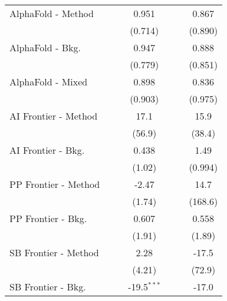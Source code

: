 \begin{tabular}{lcccccc}
   AlphaFold - Method             &              &         & 0.951         &              &              & 0.867\\   
                                  &              &         & (0.714)       &              &              & (0.890)\\   
   AlphaFold - Bkg.               &              &         & 0.947         &              &              & 0.888\\   
                                  &              &         & (0.779)       &              &              & (0.851)\\   
   AlphaFold - Mixed              &              &         & 0.898         &              &              & 0.836\\   
                                  &              &         & (0.903)       &              &              & (0.975)\\   
   AI Frontier - Method           &              &         & 17.1          &              &              & 15.9\\   
                                  &              &         & (56.9)        &              &              & (38.4)\\   
   AI Frontier - Bkg.             &              &         & 0.438         &              &              & 1.49\\   
                                  &              &         & (1.02)        &              &              & (0.994)\\   
   PP Frontier - Method           &              &         & -2.47         &              &              & 14.7\\   
                                  &              &         & (1.74)        &              &              & (168.6)\\   
   PP Frontier - Bkg.             &              &         & 0.607         &              &              & 0.558\\   
                                  &              &         & (1.91)        &              &              & (1.89)\\   
   SB Frontier - Method           &              &         & 2.28          &              &              & -17.5\\   
                                  &              &         & (4.21)        &              &              & (72.9)\\   
   SB Frontier - Bkg.             &              &         & -19.5$^{***}$ &              &              & -17.0\\   

\end{tabular}
